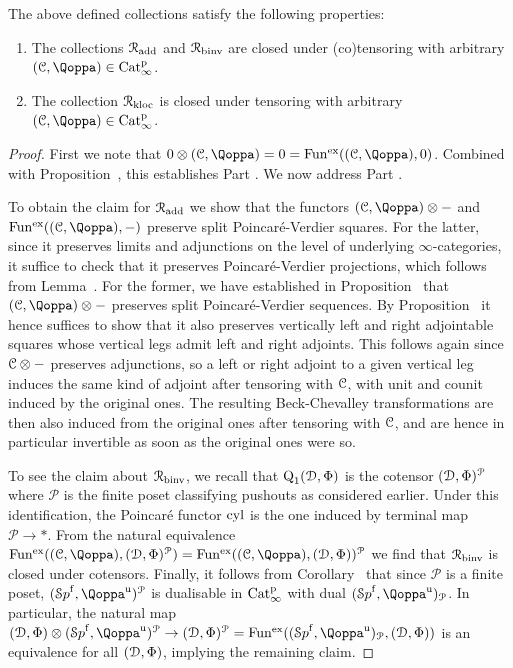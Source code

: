 \begin{proposition}
\label{prop:closure-properties-of-Rs}%
The above defined collections satisfy the following properties:
\begin{enumerate}
\item
\label{item:list1}%
The collections $\mathcal{R}_{\mathrm{add}}$ and $\mathcal{R}_{\mathrm{binv}}$ are closed under (co)tensoring with arbitrary $(\C,\QF) \in \Catp$.
\item
\label{item:list2}%
The collection $\mathcal{R}_{\mathrm{kloc}}$ is closed under tensoring with arbitrary $(\C,\QF) \in \Catp$.
\end{enumerate}
\end{proposition}
\begin{proof}
First we note that $0 \otimes (\C,\QF) = 0 = \Funx((\C,\QF),0)$. 
Combined with Proposition~, this establishes Part . We now address Part .

To obtain the claim for $\mathcal{R}_{\mathrm{add}}$ we show that the functors $(\C,\QF)\otimes -$ and $\Funx((\C,\QF),-)$ preserve split Poincar\'e-Verdier squares.
For the latter, since it preserves limits and adjunctions on the level of underlying $\infty$-categories, it suffice to check that it preserves Poincaré-Verdier projections, which follows from Lemma~.
For the former, we have established in Proposition~\; that $(\C,\QF) \otimes -$ preserves split Poincaré-Verdier sequences.
By Proposition~ it hence suffices to show that it also preserves vertically left and right adjointable squares whose vertical legs admit left and right adjoints. This follows again since $\mathcal C\otimes -$ preserves adjunctions, so a left or right adjoint to a given vertical leg induces the same kind of adjoint after tensoring with $\mathcal C$, with unit and counit induced by the original ones. The resulting Beck-Chevalley transformations are then also induced from the original ones after tensoring with $\mathcal C$, and are hence in particular invertible as soon as the original ones were so. 

To see the claim about $\mathcal{R}_{\mathrm{binv}}$, we recall that $\operatorname{Q}_1(\mathcal{D},\Phi)$ is the cotensor $(\mathcal{D},\Phi)^{\mathcal{P}}$ where $\mathcal{P}$ is the finite poset classifying pushouts as considered earlier.
Under this identification, the Poincaré functor $\mathrm{cyl}$ is the one induced by terminal map $\mathcal{P} \to \ast$.
From the natural equivalence $\Funx((\C,\QF),(\D,\QFD)^{\mathcal{P}}) = \Funx((\C,\QF),(\D,\QFD))^{\mathcal{P}}$ we find that $\mathcal{R}_{\mathrm{binv}}$ is closed under cotensors. Finally, it follows from Corollary~ that since $\mathcal{P}$ is a finite poset, $(\Spaf,\QF^\uni)^{\mathcal{P}}$ is dualisable in $\mathrm{Cat}^{\mathrm p}_\infty$ with dual $(\Spaf,\QF^\uni)_{\mathcal{P}}$. In particular, the natural map
$(\D,\QFD) \otimes (\Spaf,\QF^{\uni})^{\mathcal{P}} \to (\D,\QFD)^{\mathcal{P}} = \Funx((\Spaf,\QF^\uni)_{\mathcal{P}},(\D,\QFD))$ is an equivalence for all $(\mathcal{D},\Phi)$, implying the remaining claim. 
\end{proof}

